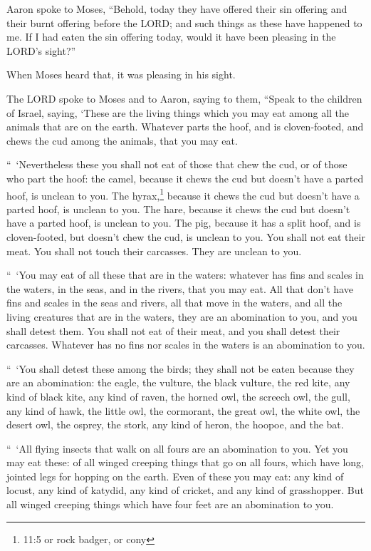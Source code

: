 \myverse{}Aaron spoke to Moses, “Behold, today they have offered their
sin offering and their burnt offering before the LORD; and such things as these have happened to me. If
I had eaten the sin offering today, would it have been pleasing in the LORD’s sight?”


\myverse{}When Moses heard that, it was pleasing in his sight.


\mychapter{} \myverse*{}The LORD spoke to Moses and to Aaron, saying to them,
\myverse{}“Speak to the children of Israel, saying, ‘These are the living things which
you may eat among all the animals that are on the earth.
\myverse{}Whatever parts the hoof, and is cloven-footed, and chews the cud among the
animals, that you may eat.


\myverse{}“ ‘Nevertheless these you shall not eat of those that chew the
cud, or of those who part the hoof: the camel, because it chews the cud but doesn’t have a parted hoof,
is unclean to you.
\myverse{}The hyrax,\footnote{11:5 or rock badger, or cony} because it chews the cud but doesn’t have a parted hoof, is
unclean to you.
\myverse{}The hare, because it chews the cud but doesn’t have a parted hoof, is unclean
to you.
\myverse{}The pig, because it has a split hoof, and is cloven-footed, but doesn’t chew
the cud, is unclean to you.
\myverse{}You shall not eat their meat. You shall not touch their carcasses. They are
unclean to you.


\myverse{}“ ‘You may eat of all these that are in the waters: whatever has
fins and scales in the waters, in the seas, and in the rivers, that you may eat.
\myverse{}All that don’t have fins and scales in the seas and rivers, all that move
in the waters, and all the living creatures that are in the waters, they are an abomination to you,
\myverse{}and you shall detest them. You shall not eat of their meat, and you shall
detest their carcasses.
\myverse{}Whatever has no fins nor scales in the waters is an abomination to you.


\myverse{}“ ‘You shall detest these among the birds; they shall not be
eaten because they are an abomination: the eagle, the vulture, the black vulture,
\myverse{}the red kite, any kind of black kite,
\myverse{}any kind of raven,
\myverse{}the horned owl, the screech owl, the gull, any kind of hawk,
\myverse{}the little owl, the cormorant, the great owl,
\myverse{}the white owl, the desert owl, the osprey,
\myverse{}the stork, any kind of heron, the hoopoe, and the bat.


\myverse{}“ ‘All flying insects that walk on all fours are an abomination
to you.
\myverse{}Yet you may eat these: of all winged creeping things that go on all fours,
which have long, jointed legs for hopping on the earth.
\myverse{}Even of these you may eat: any kind of locust, any kind of katydid, any kind
of cricket, and any kind of grasshopper.
\myverse{}But all winged creeping things which have four feet are an abomination to
you.


